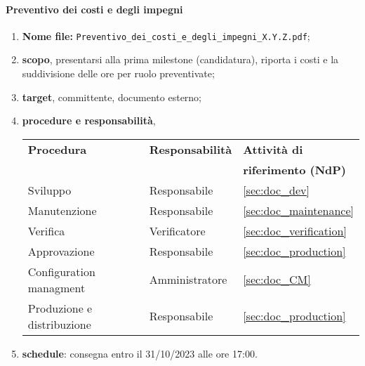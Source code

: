         \paragraph{Preventivo dei costi e degli impegni}
            \begin{enumerate}
                \item \textbf{Nome file:} \texttt{Preventivo\_dei\_costi\_e\_degli\_impegni\_X.Y.Z.pdf};
                \item \textbf{scopo}, presentarsi alla prima milestone (candidatura), riporta i costi e la suddivisione delle ore per ruolo preventivate;
                \item \textbf{target}, committente, documento esterno;
                \item \textbf{procedure e responsabilità},
                \\
                \begin{tabularx}{0.93\textwidth}{|X|X|X|}
                    \hline
                    \textbf{Procedura} & \textbf{Responsabilità} & \textbf{Attività di} \\
                    & & \textbf{riferimento (NdP)} \\
                    \hline
                    Sviluppo & Responsabile &  \ref{sec:doc_dev}
                    \\\hline
                    Manutenzione & Responsabile & \ref{sec:doc_maintenance}
                    \\\hline
                    Verifica & Verificatore & \ref{sec:doc_verification}
                    \\\hline
                    Approvazione & Responsabile & \ref{sec:doc_production}
                    \\\hline
                    Configuration managment & Amministratore & \ref{sec:doc_CM}
                    \\\hline
                    Produzione e distribuzione & Responsabile & \ref{sec:doc_production}
                    \\\hline
                \end{tabularx}
                \item \textbf{schedule}: consegna entro il 31/10/2023 alle ore 17:00.
            \end{enumerate} 

